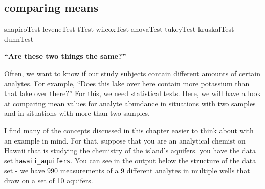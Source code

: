 \documentclass[
]{krantz}
\begin{document}
\hypertarget{comparing-means}{%
\subsection{comparing means}\label{comparing-means}}

shapiroTest
leveneTest
tTest
wilcoxTest
anovaTest
tukeyTest
kruskalTest
dunnTest

\textbf{``Are these two things the same?''}

Often, we want to know if our study subjects contain different amounts of certain analytes. For example, ``Does this lake over here contain more potassium than that lake over there?'' For this, we need statistical tests. Here, we will have a look at comparing mean values for analyte abundance in situations with two samples and in situations with more than two samples.

I find many of the concepts discussed in this chapter easier to think about with an example in mind. For that, suppose that you are an analytical chemist on Hawaii that is studying the chemistry of the island's aquifers. you have the data set \texttt{hawaii\_aquifers}. You can see in the output below the structure of the data set - we have 990 measurements of a 9 different analytes in multiple wells that draw on a set of 10 aquifers.
\end{document}
